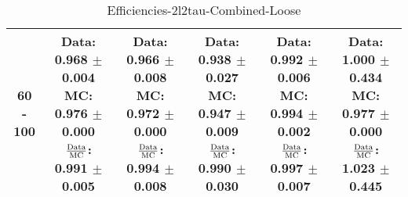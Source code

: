 \documentclass[final,letterpaper,twoside,12pt]{article}
\begin{document}
\begin{table}[htbp]
\begin{adjustwidth}{-4em}{-4em}
\begin{tabular}{|c|c|c|c|c|c|}
60 - 100 & \parbox[c]{1.1 in}{ \scriptsize  Data: 0.968 $\pm$ 0.004 \newline MC: 0.976 $\pm$ 0.000 \newline $\frac{\rm{Data}}{\rm{MC}}$: 0.991 $\pm$ 0.005} & \parbox[c]{1.1 in}{ \scriptsize  Data: 0.966 $\pm$ 0.008 \newline MC: 0.972 $\pm$ 0.000 \newline $\frac{\rm{Data}}{\rm{MC}}$: 0.994 $\pm$ 0.008} & \parbox[c]{1.1 in}{ \scriptsize  Data: 0.938 $\pm$ 0.027 \newline MC: 0.947 $\pm$ 0.009 \newline $\frac{\rm{Data}}{\rm{MC}}$: 0.990 $\pm$ 0.030} & \parbox[c]{1.1 in}{ \scriptsize  Data: 0.992 $\pm$ 0.006 \newline MC: 0.994 $\pm$ 0.002 \newline $\frac{\rm{Data}}{\rm{MC}}$: 0.997 $\pm$ 0.007} & \parbox[c]{1.1 in}{ \scriptsize  Data: 1.000 $\pm$ 0.434 \newline MC: 0.977 $\pm$ 0.000 \newline $\frac{\rm{Data}}{\rm{MC}}$: 1.023 $\pm$ 0.445}\\ \hline 
\end{tabular}
\caption {Efficiencies-2l2tau-Combined-Loose}
\label{tab:cqdata0}
\end{adjustwidth}\end{table}
\end{document}
